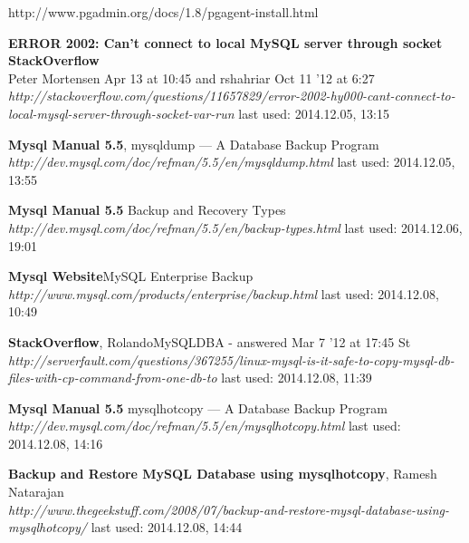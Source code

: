 \documentclass[10pt]{article}
\begin{document}
http://www.pgadmin.org/docs/1.8/pgagent-install.html
\newpage
\begin{thebibliography}{56}

  
  \textbf{ERROR 2002: Can't connect to local MySQL server through socket \\ StackOverflow} \\ Peter Mortensen Apr 13 at 10:45 and  rshahriar Oct 11 '12 at 6:27 \\
  \textit{http://stackoverflow.com/questions/11657829/error-2002-hy000-cant-connect-to-local-mysql-server-through-socket-var-run}
  \newline last used: 2014.12.05, 13:15
 
  \textbf{Mysql Manual 5.5}, mysqldump — A Database Backup Program\\
  \textit{http://dev.mysql.com/doc/refman/5.5/en/mysqldump.html}
  \newline last used: 2014.12.05, 13:55
    
  \textbf{Mysql Manual 5.5} Backup and Recovery Types\\
  \textit{http://dev.mysql.com/doc/refman/5.5/en/backup-types.html}
  \newline last used: 2014.12.06, 19:01
  
  \textbf{Mysql Website}MySQL Enterprise Backup\\
  \textit{http://www.mysql.com/products/enterprise/backup.html}
  \newline last used: 2014.12.08, 10:49

  \textbf{StackOverflow}, RolandoMySQLDBA - answered Mar 7 '12 at 17:45 St\\
  \textit{http://serverfault.com/questions/367255/linux-mysql-is-it-safe-to-copy-mysql-db-files-with-cp-command-from-one-db-to
}
  \newline last used: 2014.12.08, 11:39


  \textbf{Mysql Manual 5.5} mysqlhotcopy — A Database Backup Program\\
  \textit{http://dev.mysql.com/doc/refman/5.5/en/mysqlhotcopy.html}
  \newline last used: 2014.12.08, 14:16

  \textbf{Backup and Restore MySQL Database using mysqlhotcopy},  Ramesh Natarajan \\
  \textit{http://www.thegeekstuff.com/2008/07/backup-and-restore-mysql-database-using-mysqlhotcopy/}
  \newline last used: 2014.12.08, 14:44
  

\end{thebibliography}
\end{document}
